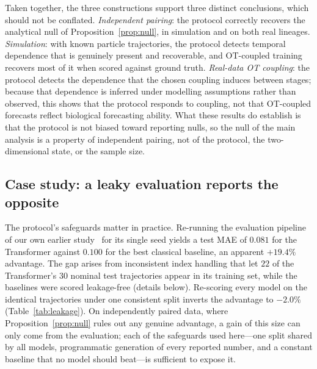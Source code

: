 \documentclass[10pt,letterpaper]{article}
\begin{document}
Taken together, the three constructions support three distinct conclusions, which should not be conflated. \emph{Independent pairing}: the protocol correctly recovers the analytical null of Proposition~\ref{prop:null}, in simulation and on both real lineages. \emph{Simulation}: with known particle trajectories, the protocol detects temporal dependence that is genuinely present and recoverable, and OT-coupled training recovers most of it when scored against ground truth. \emph{Real-data OT coupling}: the protocol detects the dependence that the chosen coupling induces between stages; because that dependence is inferred under modelling assumptions rather than observed, this shows that the protocol responds to coupling, not that OT-coupled forecasts reflect biological forecasting ability. What these results do establish is that the protocol is not biased toward reporting nulls, so the null of the main analysis is a property of independent pairing, not of the protocol, the two-dimensional state, or the sample size.

\subsection*{Case study: a leaky evaluation reports the opposite}
\label{subsec:res_leakage}

The protocol's safeguards matter in practice. Re-running the evaluation pipeline of our own earlier study~\cite{kanu2026transformer} for its single seed yields a test MAE of $0.081$ for the Transformer against $0.100$ for the best classical baseline, an apparent $+19.4\%$ advantage. The gap arises from inconsistent index handling that let $22$ of the Transformer's $30$ nominal test trajectories appear in its training set, while the baselines were scored leakage-free (details below). Re-scoring every model on the identical trajectories under one consistent split inverts the advantage to $-2.0\%$ (Table~\ref{tab:leakage}). On independently paired data, where Proposition~\ref{prop:null} rules out any genuine advantage, a gain of this size can only come from the evaluation; each of the safeguards used here---one split shared by all models, programmatic generation of every reported number, and a constant baseline that no model should beat---is sufficient to expose it.
\end{document}

